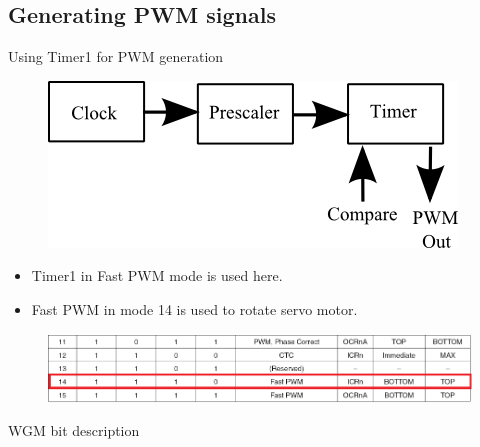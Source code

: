 \documentclass[table,10pt,red]{beamer}	%
\begin{document}
\subsection{Generating PWM signals}
\begin{frame}{Using Timer1 for PWM generation}
	\begin{figure}
		\includegraphics[width=0.5\linewidth]{"timers for pwm"}
	\end{figure}
	\begin{itemize}
	\item
	Timer1 in Fast PWM mode is used here.
	\item
	Fast PWM in mode 14 is used to rotate servo motor.
	\end{itemize}
	\begin{figure}
		\includegraphics[width=0.9\linewidth]{"wgm cropped"}
	\end{figure}
	WGM bit description
	
\end{frame}

\end{document}
